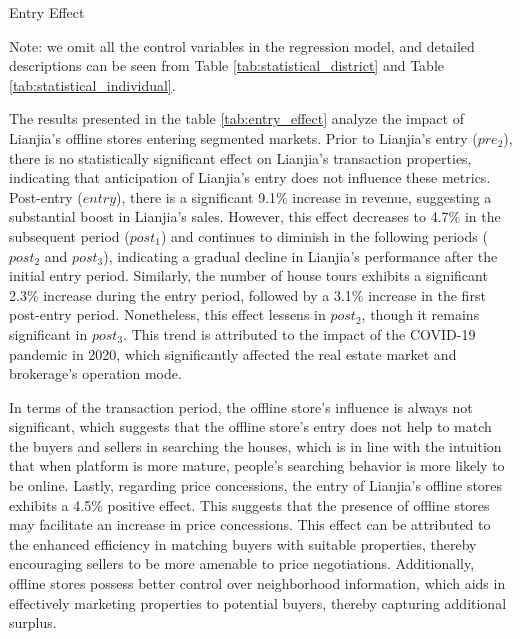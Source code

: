 \documentclass[11pt]{article}
\begin{document}
\begin{table}[htb!]
  \begin{center}
    \begin{scriptsize}
    \caption{Entry Effect}
    \label{tab:entry_effect}
      
    
    Note: we omit all the control variables in the regression model, and detailed descriptions can be seen from Table \ref{tab:statistical_district} and Table \ref{tab:statistical_individual}.
    \end{scriptsize}
  \end{center}
\end{table}

The results presented in the table \ref{tab:entry_effect} analyze the impact of Lianjia's offline stores entering segmented markets. Prior to Lianjia's entry ($pre_2$), there is no statistically significant effect on Lianjia's transaction properties, indicating that anticipation of Lianjia's entry does not influence these metrics. Post-entry ($entry$), there is a significant 9.1\% increase in revenue, suggesting a substantial boost in Lianjia's sales. However, this effect decreases to 4.7\% in the subsequent period ($post_1$) and continues to diminish in the following periods ($post_2$ and $post_3$), indicating a gradual decline in Lianjia's performance after the initial entry period. Similarly, the number of house tours exhibits a significant 2.3\% increase during the entry period, followed by a 3.1\% increase in the first post-entry period. Nonetheless, this effect lessens in $post_2$, though it remains significant in $post_3$. This trend is attributed to the impact of the COVID-19 pandemic in 2020, which significantly affected the real estate market and brokerage's operation mode.

In terms of the transaction period, the offline store's influence is always not significant, which suggests that the offline store's entry does not help to match the buyers and sellers in searching the houses, which is in line with the intuition that when platform is more mature, people's searching behavior is more likely to be online. Lastly, regarding price concessions, the entry of Lianjia's offline stores exhibits a 4.5\% positive effect. This suggests that the presence of offline stores may facilitate an increase in price concessions. This effect can be attributed to the enhanced efficiency in matching buyers with suitable properties, thereby encouraging sellers to be more amenable to price negotiations. Additionally, offline stores possess better control over neighborhood information, which aids in effectively marketing properties to potential buyers, thereby capturing additional surplus.
\end{document}
